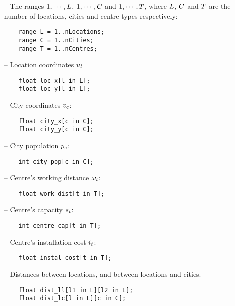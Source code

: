 \begin{itemize}
    \item[--] The ranges $1, \cdots, L$, $1, \cdots, C$ and $1, \cdots, T$, where
    $L$, $C$ and $T$ are the number of locations, cities and centre types respectively:
    
    \begin{lstlisting}
    range L = 1..nLocations;
    range C = 1..nCities;
    range T = 1..nCentres;
    \end{lstlisting}

    \item[--] Location coordinates $u_l$
    
    \begin{lstlisting}
    float loc_x[l in L];
    float loc_y[l in L];
    \end{lstlisting}
    
    \item[--] City coordinates $v_c$:
    
    \begin{lstlisting}
    float city_x[c in C];
    float city_y[c in C];
    \end{lstlisting}
    
    \item[--] City population $p_c$:
    
    \begin{lstlisting}
    int city_pop[c in C];
    \end{lstlisting}
    
    \item[--] Centre's working distance $\omega_t$:
    
    \begin{lstlisting}
    float work_dist[t in T];
    \end{lstlisting}
    
    \item[--] Centre's capacity $s_t$:
    
    \begin{lstlisting}
    int centre_cap[t in T];
    \end{lstlisting}
    
    \item[--] Centre's installation cost $i_t$:
    
    \begin{lstlisting}
    float instal_cost[t in T];
    \end{lstlisting}
    
    \item[--] Distances between locations, and between locations and cities.
    
    \begin{lstlisting}
    float dist_ll[l1 in L][l2 in L];
    float dist_lc[l in L][c in C];
    \end{lstlisting}
    
\end{itemize}

